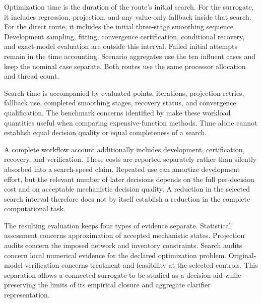 Optimization time is the duration of the route's initial search. For the surrogate, it includes regression, projection, and any value-only fallback inside that search. For the direct route, it includes the initial three-stage smoothing sequence. Development sampling, fitting, convergence certification, conditional recovery, and exact-model evaluation are outside this interval. Failed initial attempts remain in the time accounting. Scenario aggregates use the ten influent cases and keep the nominal case separate. Both routes use the same processor allocation and thread count.

Search time is accompanied by evaluated points, iterations, projection retries, fallback use, completed smoothing stages, recovery status, and convergence qualification. The benchmark concerns identified by \citet{Bliek2023} make these workload quantities useful when comparing expensive-function methods. Time alone cannot establish equal decision quality or equal completeness of a search.

A complete workflow account additionally includes development, certification, recovery, and verification. These costs are reported separately rather than silently absorbed into a search-speed claim. Repeated use can amortize development effort, but the relevant number of later decisions depends on the full per-decision cost and on acceptable mechanistic decision quality. A reduction in the selected search interval therefore does not by itself establish a reduction in the complete computational task.

The resulting evaluation keeps four types of evidence separate. Statistical assessment concerns approximation of accepted mechanistic states. Projection audits concern the imposed network and inventory constraints. Search audits concern local numerical evidence for the declared optimization problem. Original-model verification concerns treatment and feasibility at the selected controls. This separation allows a connected surrogate to be studied as a decision aid while preserving the limits of its empirical closure and aggregate clarifier representation.
